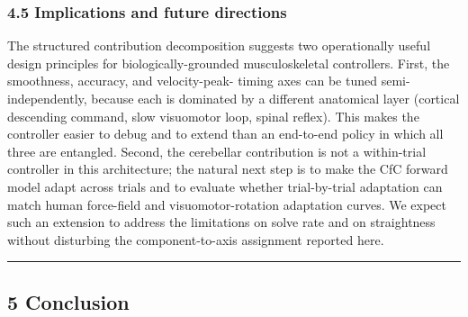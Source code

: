 \documentclass[
  11pt,
]{article}
\begin{document}
\hypertarget{implications-and-future-directions}{%
\subsubsection{4.5 Implications and future
directions}\label{implications-and-future-directions}}

The structured contribution decomposition suggests two operationally
useful design principles for biologically-grounded musculoskeletal
controllers. First, the smoothness, accuracy, and velocity-peak- timing
axes can be tuned semi-independently, because each is dominated by a
different anatomical layer (cortical descending command, slow visuomotor
loop, spinal reflex). This makes the controller easier to debug and to
extend than an end-to-end policy in which all three are entangled.
Second, the cerebellar contribution is not a within-trial controller in
this architecture; the natural next step is to make the CfC forward
model adapt across trials and to evaluate whether trial-by-trial
adaptation can match human force-field and visuomotor-rotation
adaptation curves. We expect such an extension to address the
limitations on solve rate and on straightness without disturbing the
component-to-axis assignment reported here.

\begin{center}\rule{0.5\linewidth}{0.5pt}\end{center}

\hypertarget{conclusion}{%
\subsection{5 Conclusion}\label{conclusion}}
\end{document}
